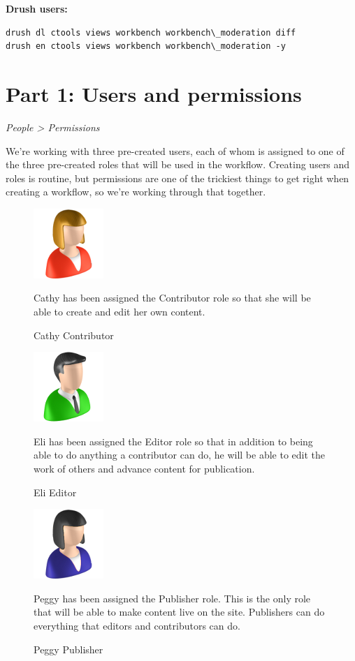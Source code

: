 \documentclass[letterpaper,10pt,english]{sphinxmanual}
\begin{document}
\textbf{Drush users:}

\begin{Verbatim}[commandchars=\\\{\}]
drush dl ctools views workbench workbench\_moderation diff
drush en ctools views workbench workbench\_moderation -y
\end{Verbatim}


\section{Part 1: Users and permissions}
\label{workbench:part-1-users-and-permissions}
\emph{People \textgreater{} Permissions}

We're working with three pre-created users, each of whom is assigned to one of the three pre-created roles that will be used in the workflow. Creating users and roles is routine, but permissions are one of the trickiest things to get right when creating a workflow, so we're working through that together.
\begin{figure}[htbp]
\centering
\capstart

\includegraphics{contributor.png}
\caption{Cathy Contributor}{\small 
Cathy has been assigned the Contributor role so that she will be able to create and edit her own content.
}\end{figure}
\begin{figure}[htbp]
\centering
\capstart

\includegraphics{editor.png}
\caption{Eli Editor}{\small 
Eli has been assigned the Editor role so that in addition to being able to do anything a contributor can do, he will be able to edit the work of others and advance content for publication.
}\end{figure}
\begin{figure}[htbp]
\centering
\capstart

\includegraphics{publisher.png}
\caption{Peggy Publisher}{\small 
Peggy has been assigned the Publisher role. This is the only role that will be able to make content live on the site. Publishers can do everything that editors and contributors can do.
}\end{figure}
\end{document}

